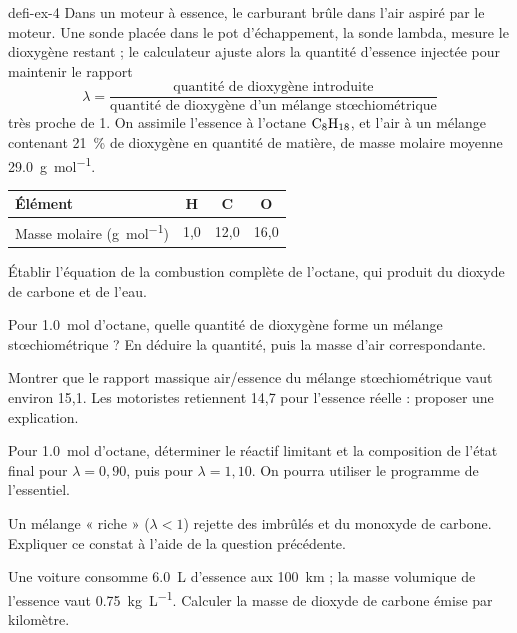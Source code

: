 \begin{blocEdition}{defi-ex-4}
Dans un moteur à essence, le carburant brûle dans l'air aspiré par le moteur. Une sonde placée dans le pot
d'échappement, la sonde lambda, mesure le dioxygène restant ; le calculateur ajuste alors la quantité d'essence injectée
pour maintenir le rapport
\[\lambda=\frac{\text{quantité de dioxygène introduite}}{\text{quantité de dioxygène d'un mélange stœchiométrique}}\]
très proche de 1. On assimile l'essence à l'octane $\ce{C8H18}$, et l'air à un mélange contenant 21~\% de dioxygène en quantité de
matière, de masse molaire moyenne \qty{29,0}{g.mol^{-1}}.
\begin{center}
\begin{tabular}{lccc}
\toprule
Élément & H & C & O \\
\midrule
Masse molaire (\unit{g.mol^{-1}}) & 1,0 & 12,0 & 16,0 \\
\bottomrule
\end{tabular}
\end{center}
\begin{questions}
\item Établir l'équation de la combustion complète de l'octane, qui produit du dioxyde de carbone et de l'eau.
\item Pour \qty{1,0}{mol} d'octane, quelle quantité de dioxygène forme un mélange stœchiométrique ? En déduire la quantité, puis
la masse d'air correspondante.
\item Montrer que le rapport massique air/essence du mélange stœchiométrique vaut environ 15,1. Les motoristes retiennent
14,7 pour l'essence réelle : proposer une explication.
\item Pour \qty{1,0}{mol} d'octane, déterminer le réactif limitant et la composition de l'état final pour $\lambda=0{,}90$, puis pour
$\lambda=1{,}10$. On pourra utiliser le programme de l'essentiel.
\item Un mélange « riche » ($\lambda<1$) rejette des imbrûlés et du monoxyde de carbone. Expliquer ce constat à l'aide de la
question précédente.
\item Une voiture consomme \qty{6,0}{L} d'essence aux \qty{100}{km} ; la masse volumique de l'essence vaut \qty{0,75}{kg.L^{-1}}. Calculer la
masse de dioxyde de carbone émise par kilomètre.
\end{questions}
\end{blocEdition}

